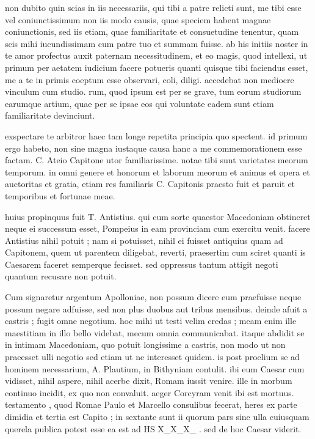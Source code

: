 


 non dubito quin scias in iis necessariis, qui tibi a patre relicti sunt, me tibi esse vel coniunctissimum non iis modo causis, quae speciem habent magnae coniunctionis, sed iis etiam, quae familiaritate et consuetudine tenentur, quam scis mihi iucundissimam cum patre tuo et summam fuisse. ab his initiis noster in te amor profectus auxit paternam necessitudinem, et eo magis, quod intellexi, ut primum per aetatem iudicium facere potueris quanti quisque tibi faciendus esset, me a te in primis coeptum esse observari, coli, diligi. accedebat non mediocre vinculum cum studio. rum, quod ipsum est per se grave, tum eorum studiorum earumque artium, quae per se ipsae eos qui voluntate eadem sunt etiam familiaritate devinciunt.

 exspectare te arbitror haec tam longe repetita principia quo spectent. id primum ergo habeto, non sine magna iustaque causa hanc a me commemorationem esse factam. C. Ateio Capitone utor familiarissime. notae tibi sunt varietates meorum temporum. in omni genere et honorum et laborum meorum et animus et opera et auctoritas et gratia, etiam res familiaris C. Capitonis praesto fuit et paruit et temporibus et fortunae meae.

 huius propinquus fuit T. Antistius. qui cum sorte quaestor Macedoniam obtineret neque ei successum esset, Pompeius in eam provinciam cum exercitu venit. facere Antistius nihil potuit ; nam si potuisset, nihil ei fuisset antiquius quam ad Capitonem, quem ut parentem diligebat, reverti, praesertim cum sciret quanti is Caesarem faceret semperque fecisset. sed oppressus tantum attigit negoti quantum recusare non potuit.

 Cum signaretur argentum Apolloniae, non possum dicere eum praefuisse neque possum negare adfuisse, sed non plus duobus aut tribus mensibus. deinde afuit a castris ; fugit omne negotium. hoc mihi ut testi velim credas ; meam enim ille maestitiam in illo bello videbat, mecum omnia communicabat. itaque abdidit se in intimam Macedoniam, quo potuit longissime a castris, non modo ut non praeesset ulli negotio sed etiam ut ne interesset quidem. is post proelium se ad hominem necessarium, A. Plautium, in Bithyniam contulit. ibi eum Caesar cum vidisset, nihil aspere, nihil acerbe dixit, Romam iussit venire. ille in morbum continuo incidit, ex quo non convaluit. aeger Corcyram venit ibi est mortuus. testamento , quod Romae Paulo et Marcello consulibus fecerat, heres ex parte dimidia et tertia est Capito ; in sextante sunt ii quorum pars sine ulla cuiusquam querela publica potest esse ea est ad HS X_X_X_ . sed de hoc Caesar viderit.

